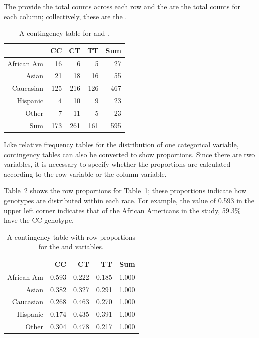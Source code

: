The  provide the total counts across each row and the  are the total counts for each column; collectively, these are the .

\begin{table}[ht]
	\centering
	\begin{tabular}{rrrrr}
		\hline
		& CC & CT & TT & Sum \\ 
		\hline
		African Am & 16 & 6 & 5 & 27 \\ 
		Asian & 21 & 18 & 16 & 55 \\ 
		Caucasian & 125 & 216 & 126 & 467 \\ 
		Hispanic & 4 & 10 & 9 & 23 \\ 
		Other & 7 & 11 & 5 & 23 \\ 
		Sum & 173 & 261 & 161 & 595 \\ 
		\hline
	\end{tabular}
	\caption{A contingency table for  and .} 
	\label{famussContingencyTable}
\end{table}

Like relative frequency tables for the distribution of one categorical variable, contingency tables can also be converted to show proportions. Since there are two variables, it is necessary to specify whether the proportions are calculated according to the row variable or the column variable. 

Table~\ref{famussRowPropTable} shows the row proportions for Table~\ref{famussContingencyTable}; these proportions indicate how genotypes are distributed within each race. For example, the value of 0.593 in the upper left corner indicates that of the African Americans in the study, 59.3\% have the CC genotype.


\begin{table}[ht]
	\centering
	\begin{tabular}{rrrrr}
		\hline
		& CC & CT & TT & Sum \\ 
		\hline
		African Am & 0.593 & 0.222 & 0.185 & 1.000 \\ 
		Asian & 0.382 & 0.327 & 0.291 & 1.000 \\ 
		Caucasian & 0.268 & 0.463 & 0.270 & 1.000 \\ 
		Hispanic & 0.174 & 0.435 & 0.391 & 1.000 \\ 
		Other & 0.304 & 0.478 & 0.217 & 1.000 \\ 
		\hline
	\end{tabular}
	\caption{A contingency table with row proportions for the  and  variables.} 
	\label{famussRowPropTable}
\end{table}


